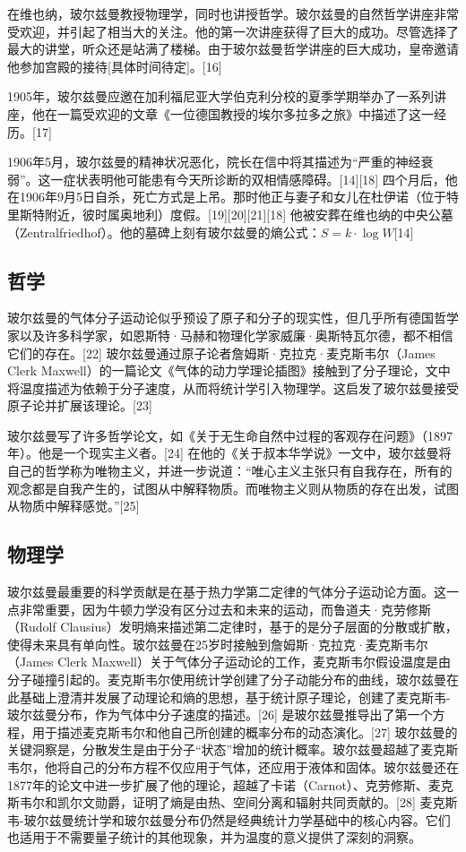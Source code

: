 在维也纳，玻尔兹曼教授物理学，同时也讲授哲学。玻尔兹曼的自然哲学讲座非常受欢迎，并引起了相当大的关注。他的第一次讲座获得了巨大的成功。尽管选择了最大的讲堂，听众还是站满了楼梯。由于玻尔兹曼哲学讲座的巨大成功，皇帝邀请他参加宫殿的接待[具体时间待定]。[16]

1905年，玻尔兹曼应邀在加利福尼亚大学伯克利分校的夏季学期举办了一系列讲座，他在一篇受欢迎的文章《一位德国教授的埃尔多拉多之旅》中描述了这一经历。[17]

1906年5月，玻尔兹曼的精神状况恶化，院长在信中将其描述为“严重的神经衰弱”。这一症状表明他可能患有今天所诊断的双相情感障碍。[14][18] 四个月后，他在1906年9月5日自杀，死亡方式是上吊。那时他正与妻子和女儿在杜伊诺（位于特里斯特附近，彼时属奥地利）度假。[19][20][21][18] 他被安葬在维也纳的中央公墓（Zentralfriedhof）。他的墓碑上刻有玻尔兹曼的熵公式：\( S = k \cdot \log W \)[14]
\subsection{哲学}
玻尔兹曼的气体分子运动论似乎预设了原子和分子的现实性，但几乎所有德国哲学家以及许多科学家，如恩斯特·马赫和物理化学家威廉·奥斯特瓦尔德，都不相信它们的存在。[22] 玻尔兹曼通过原子论者詹姆斯·克拉克·麦克斯韦尔（James Clerk Maxwell）的一篇论文《气体的动力学理论插图》接触到了分子理论，文中将温度描述为依赖于分子速度，从而将统计学引入物理学。这启发了玻尔兹曼接受原子论并扩展该理论。[23]

玻尔兹曼写了许多哲学论文，如《关于无生命自然中过程的客观存在问题》（1897年）。他是一个现实主义者。[24] 在他的《关于叔本华学说》一文中，玻尔兹曼将自己的哲学称为唯物主义，并进一步说道：“唯心主义主张只有自我存在，所有的观念都是自我产生的，试图从中解释物质。而唯物主义则从物质的存在出发，试图从物质中解释感觉。”[25]
\subsection{物理学}
玻尔兹曼最重要的科学贡献是在基于热力学第二定律的气体分子运动论方面。这一点非常重要，因为牛顿力学没有区分过去和未来的运动，而鲁道夫·克劳修斯（Rudolf Clausius）发明熵来描述第二定律时，基于的是分子层面的分散或扩散，使得未来具有单向性。玻尔兹曼在25岁时接触到詹姆斯·克拉克·麦克斯韦尔（James Clerk Maxwell）关于气体分子运动论的工作，麦克斯韦尔假设温度是由分子碰撞引起的。麦克斯韦尔使用统计学创建了分子动能分布的曲线，玻尔兹曼在此基础上澄清并发展了动理论和熵的思想，基于统计原子理论，创建了麦克斯韦-玻尔兹曼分布，作为气体中分子速度的描述。[26] 是玻尔兹曼推导出了第一个方程，用于描述麦克斯韦尔和他自己所创建的概率分布的动态演化。[27] 玻尔兹曼的关键洞察是，分散发生是由于分子“状态”增加的统计概率。玻尔兹曼超越了麦克斯韦尔，他将自己的分布方程不仅应用于气体，还应用于液体和固体。玻尔兹曼还在1877年的论文中进一步扩展了他的理论，超越了卡诺（Carnot）、克劳修斯、麦克斯韦尔和凯尔文勋爵，证明了熵是由热、空间分离和辐射共同贡献的。[28] 麦克斯韦-玻尔兹曼统计学和玻尔兹曼分布仍然是经典统计力学基础中的核心内容。它们也适用于不需要量子统计的其他现象，并为温度的意义提供了深刻的洞察。

